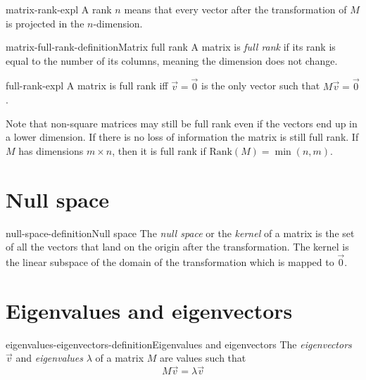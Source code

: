 \documentclass[preview]{standalone}
\begin{document}
\begin{snippet}{matrix-rank-expl}
    A rank \(n\) means that every vector after the transformation of \(M\)
    is projected in the \(n\)-dimension.
\end{snippet}

\begin{snippetdefinition}{matrix-full-rank-definition}{Matrix full rank}
    A matrix is \textit{full rank} if its rank is equal to the number of its columns, meaning
    the dimension does not change.
\end{snippetdefinition}

\begin{snippet}{full-rank-expl}
    A matrix is full rank iff \(\vec{v}=\vec{0}\) is the only vector such that \(M\vec{v}=\vec{0}\).
    
    Note that non-square matrices may still be full rank even if the vectors end up in a lower dimension.
    If there is no loss of information the matrix is still full rank.
    If \(M\) has dimensions \(m \times n\), then it is full rank if \(\text{Rank}(M)=\min(n,m)\).
\end{snippet}

\section{Null space}

\begin{snippetdefinition}{null-space-definition}{Null space}
    The \textit{null space} or the \textit{kernel} of a matrix is the set of all the vectors that land on the origin
    after the transformation.
    The kernel is the linear subspace of the domain of the transformation which is mapped to \(\vec{0}\).
\end{snippetdefinition}

\section{Eigenvalues and eigenvectors}

\begin{snippetdefinition}{eigenvalues-eigenvectors-definition}{Eigenvalues and eigenvectors}
    The \textit{eigenvectors} \(\vec{v}\) and \textit{eigenvalues} \(\lambda\) of a matrix \(M\)
    are values such that
    \[
        M\vec{v} = \lambda \vec{v}
    \]
\end{snippetdefinition}
\end{document}
